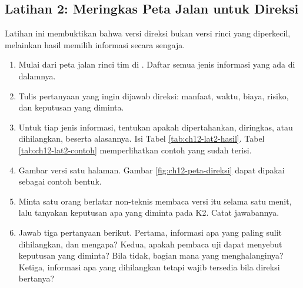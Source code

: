 \subsection*{Latihan 2: Meringkas Peta Jalan untuk Direksi}

Latihan ini membuktikan bahwa versi direksi bukan versi rinci yang diperkecil,
melainkan hasil memilih informasi secara sengaja.

\begin{enumerate}
  \item Mulai dari peta jalan rinci tim di
        . Daftar semua jenis
        informasi yang ada di dalamnya.
  \item Tulis pertanyaan yang ingin dijawab direksi: manfaat, waktu, biaya,
        risiko, dan keputusan yang diminta.
  \item Untuk tiap jenis informasi, tentukan apakah dipertahankan, diringkas,
        atau dihilangkan, beserta alasannya. Isi Tabel
        \ref{tab:ch12-lat2-hasil}. Tabel \ref{tab:ch12-lat2-contoh}
        memperlihatkan contoh yang sudah terisi.
  \item Gambar versi satu halaman. Gambar \ref{fig:ch12-peta-direksi} dapat
        dipakai sebagai contoh bentuk.
  \item Minta satu orang berlatar non-teknis membaca versi itu selama satu
        menit, lalu tanyakan keputusan apa yang diminta pada K2. Catat
        jawabannya.
  \item Jawab tiga pertanyaan berikut. Pertama, informasi apa yang paling sulit
        dihilangkan, dan mengapa? Kedua, apakah pembaca uji dapat menyebut
        keputusan yang diminta? Bila tidak, bagian mana yang menghalanginya?
        Ketiga, informasi apa yang dihilangkan tetapi wajib tersedia bila
        direksi bertanya?
\end{enumerate}

